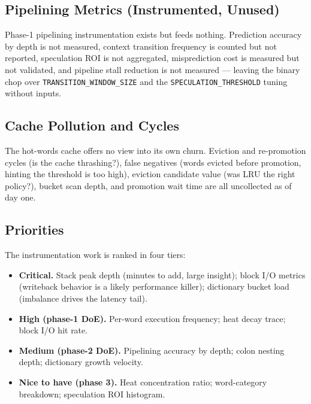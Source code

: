 \subsection{Pipelining Metrics (Instrumented, Unused)}

Phase-1 pipelining instrumentation exists but feeds nothing. Prediction accuracy
by depth is not measured, context transition frequency is counted but not
reported, speculation ROI is not aggregated, misprediction cost is measured but
not validated, and pipeline stall reduction is not measured --- leaving the
binary chop over \texttt{TRANSITION\_WINDOW\_SIZE} and the
\texttt{SPECULATION\_THRESHOLD} tuning without inputs.

\subsection{Cache Pollution and Cycles}

The hot-words cache offers no view into its own churn. Eviction and
re-promotion cycles (is the cache thrashing?), false negatives (words evicted
before promotion, hinting the threshold is too high), eviction candidate value
(was LRU the right policy?), bucket scan depth, and promotion wait time are all
uncollected as of day one.

\subsection{Priorities}

The instrumentation work is ranked in four tiers:

\begin{itemize}
  \item \textbf{Critical.} Stack peak depth (minutes to add, large insight);
        block I/O metrics (writeback behavior is a likely performance killer);
        dictionary bucket load (imbalance drives the latency tail).
  \item \textbf{High (phase-1 DoE).} Per-word execution frequency; heat decay
        trace; block I/O hit rate.
  \item \textbf{Medium (phase-2 DoE).} Pipelining accuracy by depth; colon
        nesting depth; dictionary growth velocity.
  \item \textbf{Nice to have (phase 3).} Heat concentration ratio; word-category
        breakdown; speculation ROI histogram.
\end{itemize}


